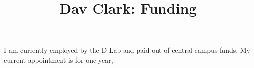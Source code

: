 \documentclass[12pt]{scrartcl}
\begin{document}
\title{Dav Clark: Funding}
\maketitle

I am currently employed by the D-Lab and paid out of central campus funds. My
current appointment is for one year,
\end{document}
